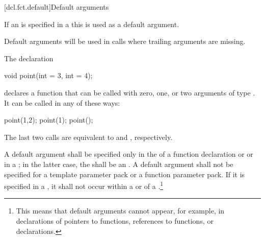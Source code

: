 [dcl.fct.default]{Default arguments}%

\pnum
If an  is specified in a
 this
is used as a default argument.
\begin{note}
Default arguments will be used in calls
where trailing arguments are missing.
\end{note}

\pnum
{}%
\begin{example}
The declaration
\begin{codeblock}
void point(int = 3, int = 4);
\end{codeblock}
declares a function that can be called with zero, one, or two arguments of type
.
It can be called in any of these ways:
\begin{codeblock}
point(1,2);  point(1);  point();
\end{codeblock}

The last two calls are equivalent to
and
,
respectively.
\end{example}

\pnum
A default argument shall be specified only in the
of a function declaration
or 
or in a
;
in the latter case, the  shall be an
.
A default argument shall not be specified for
a template parameter pack or
a function parameter pack.
If it is specified in a
,
it shall not occur within a
or
of a
.\footnote{This means that default
arguments cannot appear,
for example, in declarations of pointers to functions,
references to functions, or
declarations.
}

